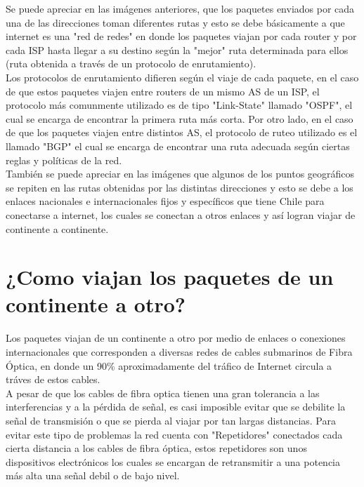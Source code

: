 \documentclass{article}
\begin{document}
Se puede apreciar en las imágenes anteriores, que los paquetes enviados por cada una de las direcciones toman diferentes rutas y esto se debe básicamente a que internet es una "red de redes" en donde los paquetes viajan por cada router y por cada ISP hasta llegar a su destino según la "mejor" ruta determinada para ellos (ruta obtenida a través de un protocolo de enrutamiento).\\

Los protocolos de enrutamiento difieren según el viaje de cada paquete, en el caso de que estos paquetes viajen entre routers de un mismo AS de un ISP, el protocolo más comunmente utilizado es de tipo "Link-State" llamado "OSPF", el cual se encarga de encontrar la primera ruta más corta. Por otro lado, en el caso de que los paquetes viajen entre distintos AS, el protocolo de ruteo utilizado es el llamado "BGP" el cual se encarga de encontrar una ruta adecuada según ciertas reglas y políticas de la red.\\


También se puede apreciar en las imágenes que algunos de los puntos geográficos se repiten en las rutas obtenidas por las distintas direcciones y esto se debe a los enlaces nacionales e internacionales fijos y específicos que tiene Chile para conectarse a internet, los cuales se conectan a otros enlaces y así logran viajar de continente a continente.\\


\section{¿Como viajan los paquetes de un continente a otro?}

Los paquetes viajan de un continente a otro por medio de enlaces o conexiones internacionales que corresponden a diversas redes de cables submarinos de Fibra Óptica, en donde un 90\% aproximadamente del tráfico de Internet circula a tráves de estos cables.\\

A pesar de que los cables de fibra optica tienen una gran tolerancia a las interferencias y a la pérdida de señal, es casi imposible evitar que se debilite la señal de transmisión o que se pierda al viajar por tan largas distancias. Para evitar este tipo de problemas la red cuenta con "Repetidores" conectados cada cierta distancia a los cables de fibra óptica, estos repetidores son unos dispositivos electrónicos los cuales se encargan de retransmitir a una potencia más alta una señal debil o de bajo nivel.\\
\end{document}
